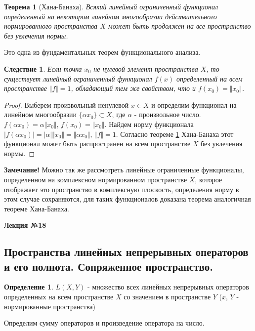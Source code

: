 \documentclass[14pt,a4paper]{extarticle}
\newtheorem{theorem}{Теорема}[section]
\newtheorem{corollary}{Следствие}[theorem]
\theoremstyle{definition}
\newtheorem{definition}{Определение}[section]
\theoremstyle{remark}
\renewcommand{\[}{\begin{dmath*}[compact]}
\renewcommand{\]}{\end{dmath*}}
\begin{document}
\begin{theorem}[Хана-Банаха]
\label{th:Хана-Банаха}
  Всякий линейный ограниченный функционал определенный на некотором
  линейном многообразии действительного нормированного пространства $X$
  может быть продолжен на все пространство без увлечения нормы.
\end{theorem}

Это одна из фундаментальных теорем функционального анализа.

\begin{corollary}
  Если точка $x_0$ не нулевой элемент пространства $X$, то существует линейный
  ограниченный функционал $f(x)$ определенный на всем пространстве
  $\Vert f \Vert = 1$, обладающий тем же свойством, что и
  $f(x_0) = \Vert x_0 \Vert$.
\end{corollary}

\begin{proof}
  Выберем произвольный ненулевой $x \in X$ и определим функционал на
  линейном многообразии $\{\alpha x_0\} \subset X$,
  где $\alpha$ - произвольное число.
  $f(\alpha x_0) = \alpha \Vert x_0 \Vert$, $f(x_0) = \Vert x_0 \Vert$.
  Найдем норму функционала $|f(\alpha x_0)| = |\alpha| \Vert x_0 \Vert =
  \Vert \alpha x_0 \Vert$, $\Vert f \Vert = 1$. Согласно теореме
  \ref{th:Хана-Банаха} Хана-Банаха этот функционал может быть распространен
  на всем пространстве $X$ без увлечения нормы.
\end{proof}

\textbf{Замечание!} Можно так же рассмотреть линейные ограниченные функционалы,
определенном на комплексном нормированном пространстве $X$, которое отображает
это пространство в комплексную плоскость, определения норму в этом случае
сохраняются, для таких функционалов доказана теорема аналогичная теореме
Хана-Банаха.

\textbf{Лекция №18}

\subsection{Пространства линейных непрерывных операторов и его полнота.
Сопряженное пространство.}

\begin{definition}
  $L(X,Y)$ - множество всех линейных непрерывных операторов определенных на всем
  пространстве $X$ со значением в пространстве $Y$ ($x$, $Y$ - нормированные
  пространства)
\end{definition}

Определим сумму операторов и произведение оператора на число.
\end{document}
